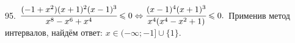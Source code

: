 \documentclass[12pt]{article}
\begin{document}
\begin{figure}[ht!]
\end{figure}\\
95. $\cfrac{(-1+x^2)(x+1)^2(x-1)^3}{x^8-x^6+x^4}\leqslant0\Leftrightarrow\cfrac{(x-1)^4(x+1)^3}{x^4(x^4-x^2+1)}\leqslant0.$ Применив метод интервалов, найдём ответ: $x\in(-\infty;-1]\cup\{1\}.$
\begin{figure}[ht!]
\end{figure}
\newpage
\end{document}
